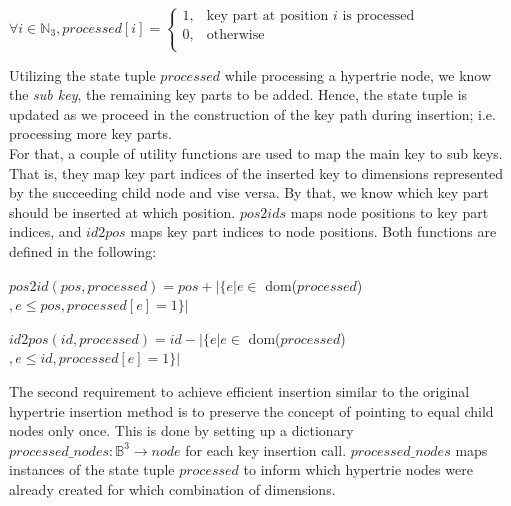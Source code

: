 \centerline{$\forall i \in \mathbb{N}_3 , processed[i] = \left\{ \begin{array}{rc} 1, & \mbox{key part at position }i\mbox{ is processed} \\ 0,  & \mbox{otherwise} \\ \end{array} \right.$}

\hspace{2cm}

Utilizing the state tuple $processed$ while processing a hypertrie node, we know the \textit{sub key}, the remaining key parts to be added. Hence, the state tuple is updated as we proceed in the construction of the key path during insertion; i.e. processing more key parts. \\

 For that, a couple of utility functions are used to map the main key to sub keys. That is, they map key part indices of the inserted key to dimensions represented by the succeeding child node and vise versa. By that, we know which key part should be inserted at which position. $pos2ids$ maps node positions to key part indices, and $id2pos$ maps key part indices to node positions. Both functions are defined in the following:\\
 
 \centerline{$pos2id(pos, processed) = pos + |\{e | e \in$ dom($processed$)$, e \leq pos, processed[e] = 1\}|$}
 \hspace{2cm}
 
 \centerline{$id2pos(id, processed) = id - |\{e | e \in$ dom($processed$)$, e \leq id, processed[e] = 1\}|$}
 \hspace{2cm}
 
 The second requirement to achieve efficient insertion similar to the original hypertrie insertion method is to preserve the concept of pointing to equal child nodes only once. This is done by setting up a dictionary $processed\_nodes: \mathbb{B}^3 \to node$ for each key insertion call.  $processed\_nodes$ maps instances of the state tuple $processed$ to inform which hypertrie nodes were already created for which combination of dimensions. \\
 
